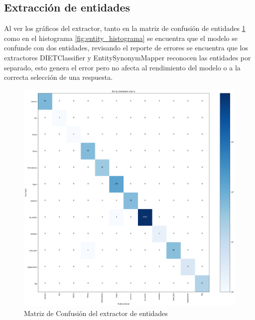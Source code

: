 \subsection{Extracción de entidades}
Al ver los gráficos del extractor, tanto en la matriz de confusión de entidades \ref{fig:entity_matriz} como en el histograma \ref{fig:entity_histograma} se encuentra que el modelo se confunde con dos entidades, revisando el reporte de errores se encuentra que los extractores DIETClassifier y EntitySynonymMapper reconocen las entidades por separado, esto genera el error pero no afecta al rendimiento del modelo o a la correcta selección de una respuesta.
\begin{figure}[h!]
    \centering
    \includegraphics[width=\textwidth]{imagenes/cap5/DIETClassifier_confusion_matrix.png}
    \caption{Matriz de Confusión del extractor de entidades}
    \label{fig:entity_matriz}
\end{figure}

